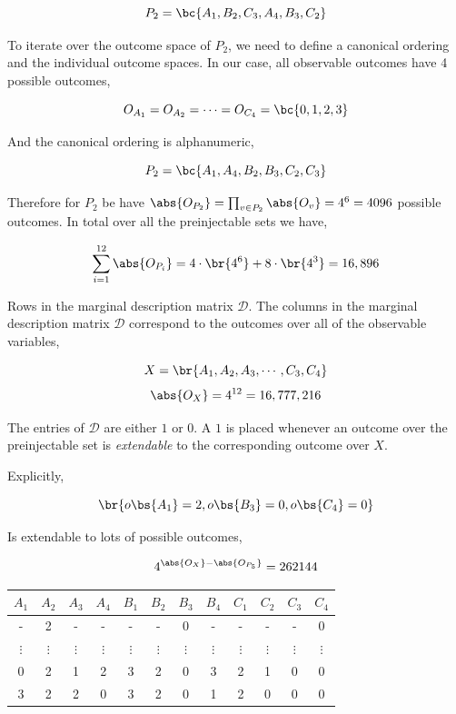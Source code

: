 \documentclass{article}
\theoremstyle{definition}
\begin{document}
    \[ P_2 = \bc{A_1, B_2, C_3, A_4, B_3, C_2} \]

    To iterate over the outcome space of $P_2$, we need to define a canonical ordering and the individual outcome spaces. In our case, all observable outcomes have 4 possible outcomes,

    \[ O_{A_1} = O_{A_2} = \cdots = O_{C_4} = \bc{0,1,2,3} \]

    And the canonical ordering is alphanumeric,

    \[ P_2 = \bc{A_1, A_4, B_2, B_3, C_2, C_3} \]

    Therefore for $P_2$ be have $\abs{O_{P_2}} = \prod_{v\in P_2} \abs{O_v} = 4^6 = 4096$ possible outcomes. In total over all the preinjectable sets we have,

    \[ \sum_{i=1}^{12} \abs{O_{P_i}} = 4 \cdot \br{4^6} + 8\cdot\br{4^3} = 16,896 \]

    Rows in the marginal description matrix $\mathcal{D}$. The columns in the marginal description matrix $\mathcal{D}$ correspond to the outcomes over all of the observable variables,

    \[ X = \br{A_1, A_2, A_3, \cdots, C_3, C_4} \]
    \[ \abs{O_X} = 4^{12} = 16,777,216 \]

    The entries of $\mathcal{D}$ are either $1$ or $0$. A $1$ is placed whenever an outcome over the preinjectable set is \textit{extendable} to the corresponding outcome over $X$.

    Explicitly,

    \[ \br{o\bs{A_1} = 2, o\bs{B_3} = 0, o\bs{C_4} = 0} \]

    Is extendable to lots of possible outcomes,

    \[ 4^{\abs{O_{X}} - \abs{O_{P_5}}} = 262144 \]

    \begin{center}
        \begin{tabular}{|c|c|c|c|c|c|c|c|c|c|c|c|}
            \hline
            $A_1$ & $A_2$ & $A_3$ & $A_4$ & $B_1$ & $B_2$ & $B_3$ & $B_4$ & $C_1$ & $C_2$ & $C_3$ & $C_4$ \\
            \hline
            \hline
            - & 2 & - & - & - & - & 0 & - & - & - & - & 0 \\
            $\vdots$ & $\vdots$ & $\vdots$ & $\vdots$ & $\vdots$ & $\vdots$ & $\vdots$ & $\vdots$ & $\vdots$ & $\vdots$ & $\vdots$ & $\vdots$ \\
            0 & 2 & 1 & 2 & 3 & 2 & 0 & 3 & 2 & 1 & 0 & 0 \\
            3 & 2 & 2 & 0 & 3 & 2 & 0 & 1 & 2 & 0 & 0 & 0 \\
            \hline
        \end{tabular}
    \end{center}
\end{document}
